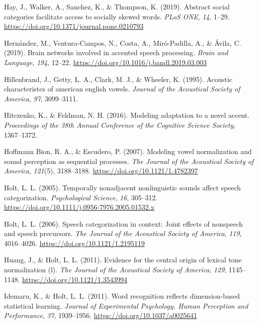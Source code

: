 \documentclass[
  11pt,
  english,
  man,floatsintext]{apa6}
\newlength{\cslhangindent}
\newlength{\cslentryspacingunit} %
\newenvironment{CSLReferences}[2] %
 {%
  \setlength{\parindent}{0pt}
  \ifodd #1
  \let\oldpar\par
  \def\par{\hangindent=\cslhangindent\oldpar}
  \fi
  \setlength{\parskip}{#2\cslentryspacingunit}
 }%
 {}
\begin{document}
\begin{CSLReferences}{1}{0}
\leavevmode{}%
Hay, J., Walker, A., Sanchez, K., \& Thompson, K. (2019). Abstract social categories facilitate access to socially skewed words. \emph{PLoS ONE}, \emph{14}, 1--29. \url{https://doi.org/10.1371/journal.pone.0210793}

\leavevmode{}%
Hernández, M., Ventura-Campos, N., Costa, A., Miró-Padilla, A., \& Ávila, C. (2019). Brain networks involved in accented speech processing. \emph{Brain and Language}, \emph{194}, 12--22. \url{https://doi.org/10.1016/j.bandl.2019.03.003}

\leavevmode{}%
Hillenbrand, J., Getty, L. A., Clark, M. J., \& Wheeler, K. (1995). Acoustic characteristcs of american english vowels. \emph{Journal of the Acoustical Society of America}, \emph{97}, 3099--3111.

\leavevmode{}%
Hitczenko, K., \& Feldman, N. H. (2016). Modeling adaptation to a novel accent. \emph{Proceedings of the 38th Annual Conference of the Cognitive Science Society}, 1367--1372.

\leavevmode{}%
Hoffmann Bion, R. A., \& Escudero, P. (2007). Modeling vowel normalization and sound perception as sequential processes. \emph{The Journal of the Acoustical Society of America}, \emph{121}(5), 3188--3188. \url{https://doi.org/10.1121/1.4782397}

\leavevmode{}%
Holt, L. L. (2005). Temporally nonadjacent nonlinguistic sounds affect speech categorization. \emph{Psychological Science}, \emph{16}, 305--312. \url{https://doi.org/10.1111/j.0956-7976.2005.01532.x}

\leavevmode{}%
Holt, L. L. (2006). Speech categorization in context: Joint effects of nonspeech and speech precursors. \emph{The Journal of the Acoustical Society of America}, \emph{119}, 4016--4026. \url{https://doi.org/10.1121/1.2195119}

\leavevmode{}%
Huang, J., \& Holt, L. L. (2011). Evidence for the central origin of lexical tone normalization (l). \emph{The Journal of the Acoustical Society of America}, \emph{129}, 1145--1148. \url{https://doi.org/10.1121/1.3543994}

\leavevmode{}%
Idemaru, K., \& Holt, L. L. (2011). Word recognition reflects dimension-based statistical learning. \emph{Journal of Experimental Psychology. Human Perception and Performance}, \emph{37}, 1939--1956. \url{https://doi.org/10.1037/a0025641}


\end{CSLReferences}
\end{document}
